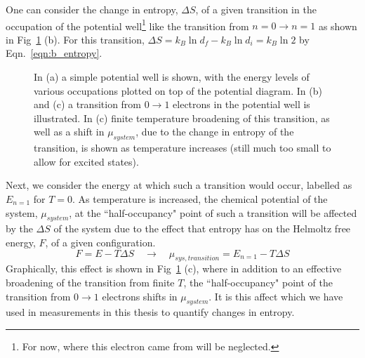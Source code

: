 One can consider the change in entropy, $\Delta S$, of a given transition in the occupation of the potential well\footnote{For now, where this electron came from will be neglected.} like the transition from $n = 0 \to n = 1$ as shown in Fig~\ref{fig:potential_wells} (b). For this transition, $\Delta S = k_B \ln d_f - k_B \ln d_i = k_B \ln 2$ by Eqn.~\ref{eqn:b_entropy}.
\begin{figure}[h]
\centering
{}
\caption{In (a) a simple potential well is shown, with the energy levels of various occupations plotted on top of the potential diagram. In (b) and (c) a transition from $0 \to 1$ electrons in the potential well is illustrated. In (c) finite temperature broadening of this transition, as well as a shift in $\mu_{system}$, due to the change in entropy of the transition, is shown as temperature increases (still much too small to allow for excited states). }
\label{fig:potential_wells}       %
\end{figure}

Next, we consider the energy at which such a transition would occur, labelled as $E_{n=1}$ for $T=0$. As temperature is increased, the chemical potential of the system, $\mu_{system}$, at the ``half-occupancy" point of such a transition will be affected by the $\Delta S$ of the system due to the effect that entropy has on the Helmoltz free energy, $F$, of a given configuration.
\begin{equation}
	F = E - T \Delta S \quad \to \quad \mu_{sys, transition}  = E_{n=1} - T \Delta S
\end{equation}
Graphically, this effect is shown in Fig~\ref{fig:potential_wells} (c), where in addition to an effective broadening of the transition from finite $T$, the ``half-occupancy" point of the transition from $0 \to 1$ electrons shifts in $\mu_{system}$. It is this affect which we have used in measurements in this thesis to quantify changes in entropy.

